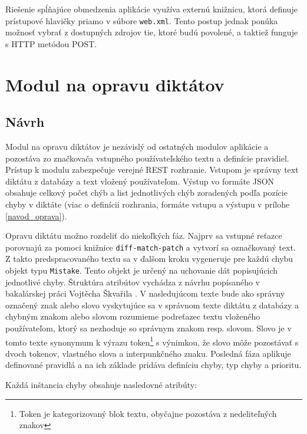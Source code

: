 \documentclass[12pt,oneside]{fithesis2}
\begin{document}
      		\par Riešenie spĺňajúce obmedzenia aplikácie využíva externú knižnicu\cite{dzhuvinov15}, ktorá definuje prístupové hlavičky priamo v súbore \texttt{web.xml}. Tento postup jednak ponúka možnosť vybrať z dostupných zdrojov tie, ktoré budú povolené, a taktiež funguje s HTTP metódou POST\cite{sof2}.
\pagebreak

      \section{Modul na opravu diktátov} \label{modul-diktaty}
      
      \subsection{Návrh}
      \par Modul na opravu diktátov je nezávislý od ostatných modulov aplikácie a pozostáva zo značkovača vstupného používateľského textu a definície pravidiel. Prístup k modulu zabezpečuje verejné REST rozhranie. Vstupom je správny text diktátu z databázy a text vložený používateľom. Výstup vo formáte JSON obsahuje celkový počet chýb a list jednotlivých chýb zoradených podľa pozície chyby v diktáte (viac o definícii rozhrania, formáte vstupu a výstupu v prílohe \ref{navod_oprava}). 
      \par Opravu diktátu možno rozdeliť do niekoľkých fáz. Najprv sa vstupné reťazce porovnajú za pomoci knižnice \texttt{diff-match-patch}\cite{diffmatchpatch} a vytvorí sa označkovaný text. Z takto predspracovaného textu sa v ďalšom kroku vygeneruje pre každú chybu objekt typu \texttt{Mistake}. Tento objekt je určený na uchovanie dát popisujúcich jednotlivé chyby. Štruktúra atribútov vychádza z návrhu popísaného v bakalárskej práci Vojtěcha Škvařila \cite{skvaril14}. V nasledujúcom texte bude ako správny označený znak alebo slovo vyskytujúce sa v správnom texte diktátu z databázy a chybným znakom alebo slovom rozumieme podreťazec textu vloženého používateľom, ktorý sa nezhoduje so správnym znakom resp. slovom. Slovo je v tomto texte synonymum k výrazu token\footnote{Token je kategorizovaný blok textu, obyčajne pozostáva z nedeliteľných znakov} s výnimkou, že slovo môže pozostávať s dvoch tokenov, vlastného slova a interpunkčného znaku. Posledná fáza aplikuje definované pravidlá a na ich základe pridáva definíciu chyby, typ chyby a prioritu.
\par Každá inštancia chyby obsahuje nasledovné atribúty:
\end{document}
